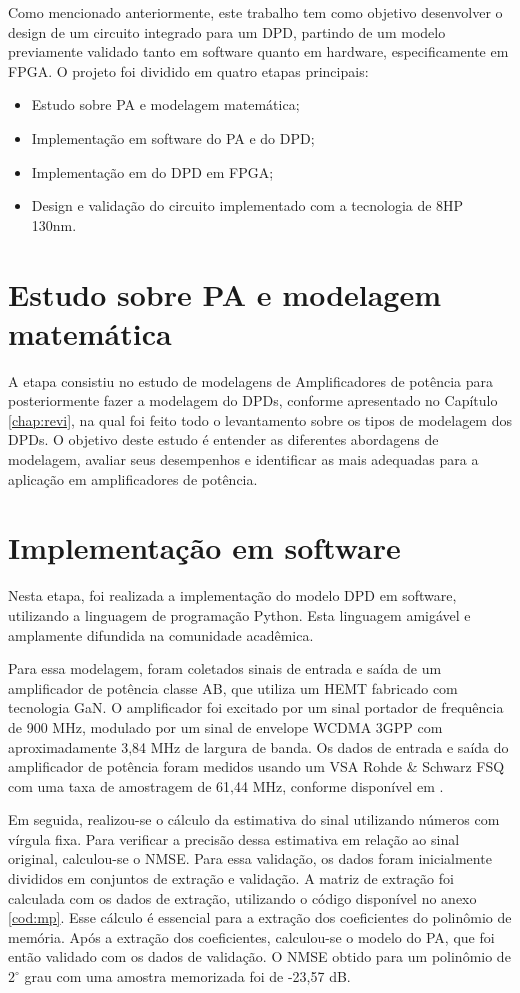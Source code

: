 Como mencionado anteriormente, este trabalho tem como objetivo desenvolver o design de um circuito integrado para um DPD, partindo de um modelo previamente validado tanto em software quanto em hardware, especificamente em FPGA. O projeto foi dividido em quatro etapas principais:

\begin{itemize}
\item Estudo sobre PA e modelagem matemática;
\item Implementação em software do PA e do DPD;
\item Implementação em do DPD em FPGA;
\item Design e validação do circuito implementado com a tecnologia de 8HP 130nm.
\end{itemize}


\section{Estudo sobre PA e modelagem matemática}
A etapa consistiu no estudo de modelagens de Amplificadores de potência para posteriormente fazer a modelagem do DPDs, conforme apresentado no Capítulo \ref{chap:revi}, na qual foi feito todo o levantamento sobre os tipos de modelagem dos DPDs. O objetivo deste estudo é entender as diferentes abordagens de modelagem, avaliar seus desempenhos e identificar as mais adequadas para a aplicação em amplificadores de potência.

\section{Implementação em software} \label{sec:implsoft}

Nesta etapa, foi realizada a implementação do modelo DPD em software, utilizando a linguagem de programação Python. Esta linguagem amigável e amplamente difundida na comunidade acadêmica.

Para essa modelagem, foram coletados sinais de entrada e saída de um amplificador de potência classe AB, que utiliza um HEMT fabricado com tecnologia GaN. O amplificador foi excitado por um sinal portador de frequência de 900 MHz, modulado por um sinal de envelope WCDMA 3GPP com aproximadamente 3,84 MHz de largura de banda. Os dados de entrada e saída do amplificador de potência foram medidos usando um VSA Rohde \& Schwarz FSQ com uma taxa de amostragem de 61,44 MHz, conforme disponível em \cite{Bonfim2016}.

Em seguida, realizou-se o cálculo da estimativa do sinal utilizando números com vírgula fixa. Para verificar a precisão dessa estimativa em relação ao sinal original, calculou-se o NMSE. Para essa validação, os dados foram inicialmente divididos em conjuntos de extração e validação. A matriz de extração foi calculada com os dados de extração, utilizando o código disponível no anexo \ref{cod:mp}. Esse cálculo é essencial para a extração dos coeficientes do polinômio de memória. Após a extração dos coeficientes, calculou-se o modelo do PA, que foi então validado com os dados de validação. O NMSE obtido para um polinômio de $2^\circ$ grau com uma amostra memorizada foi de -23,57 dB.

